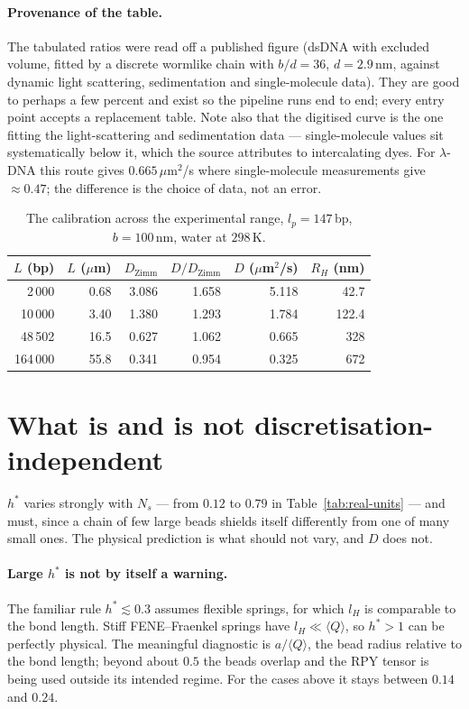 \documentclass[11pt,a4paper]{report}
\begin{document}
\paragraph{Provenance of the table.} The tabulated ratios were read off a
published figure (dsDNA with excluded volume, fitted by a discrete wormlike chain
with $b/d = 36$, $d = 2.9$\,nm, against dynamic light scattering, sedimentation
and single-molecule data). They are good to perhaps a few percent and exist so the
pipeline runs end to end; every entry point accepts a replacement table. Note also
that the digitised curve is the one fitting the light-scattering and sedimentation
data --- single-molecule values sit systematically below it, which the source
attributes to intercalating dyes. For $\lambda$-DNA this route gives
$0.665\,\mu$m$^2$/s where single-molecule measurements give $\approx0.47$; the
difference is the choice of data, not an error.

\begin{table}[ht]
\centering
\caption{The calibration across the experimental range, $l_p = 147$\,bp,
$b = 100$\,nm, water at $298$\,K.}
\label{tab:dna-calib}
\begin{tabular}{@{}rrrrrr@{}}
\toprule
$L$ (bp) & $L$ ($\mu$m) & $D_{\mathrm{Zimm}}$ & $D/D_{\mathrm{Zimm}}$ & $D$ ($\mu$m$^2$/s) & $R_H$ (nm) \\
\midrule
2\,000   & 0.68  & 3.086 & 1.658 & 5.118 & 42.7 \\
10\,000  & 3.40  & 1.380 & 1.293 & 1.784 & 122.4 \\
48\,502  & 16.5  & 0.627 & 1.062 & 0.665 & 328 \\
164\,000 & 55.8  & 0.341 & 0.954 & 0.325 & 672 \\
\bottomrule
\end{tabular}
\end{table}

\section{What is and is not discretisation-independent}

$h^{*}$ varies strongly with $N_s$ --- from $0.12$ to $0.79$ in
Table~\ref{tab:real-units} --- and must, since a chain of few large beads shields
itself differently from one of many small ones. The physical prediction is what
should not vary, and $D$ does not.

\paragraph{Large $h^{*}$ is not by itself a warning.} The familiar rule
$h^{*}\lesssim0.3$ assumes flexible springs, for which $l_H$ is comparable to the
bond length. Stiff FENE--Fraenkel springs have $l_H \ll \langle Q\rangle$, so
$h^{*}>1$ can be perfectly physical. The meaningful diagnostic is $a/\langle
Q\rangle$, the bead radius relative to the bond length; beyond about $0.5$ the
beads overlap and the RPY tensor is being used outside its intended regime. For
the cases above it stays between $0.14$ and $0.24$.
\end{document}
